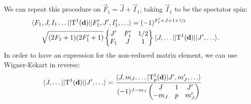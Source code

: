 %
We can repeat this procedure on $\vec F_1=\vec J+\vec I_1$, taking $\vec I_1$ to
be the spectator spin:
%
\begin{align}
    \label{useST2}
    \langle F_1&,J,I_1\ldots||\mathrm{T}^1(\mathbf{d})||F_1',J',I_1',\ldots\rangle
    =(-1)^{F_1'+J+1+\nicefrac{1}{2}}\\\nonumber
    &\sqrt{(2F_1+1)(2F_1'+1)}
    \begin{Bmatrix}J'&F_1'&1/2\\F_1&J&1\end{Bmatrix}
    \langle J,\ldots||\mathrm{T}^1(\mathbf{d})||J',\ldots\rangle.
\end{align}
%
In order to have an expression for the non-reduced matrix element, we can use
Wigner-Eckart in reverse:
%
\begin{equation}
    \label{reverseWE}
\begin{aligned}
    \langle J,&\ldots||\mathrm{T}^1(\mathbf{d})||J',\ldots\rangle
    =
    \frac{\langle J,m_J,\ldots|\mathrm{T}_p^1(\mathbf{d})|J',m_J',\ldots\rangle}
         {(-1)^{J-m_J}\begin{pmatrix}J&1&J'\\-m_J&p&m_J'\end{pmatrix}}
\end{aligned}
\end{equation}

